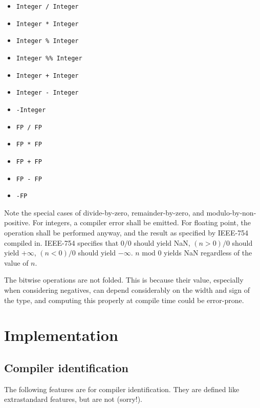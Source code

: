 \documentclass{article}
\begin{document}
\begin{itemize}
\item{\texttt{Integer / Integer}}
\item{\texttt{Integer * Integer}}
\item{\texttt{Integer \% Integer}}
\item{\texttt{Integer \%\% Integer}}
\item{\texttt{Integer + Integer}}
\item{\texttt{Integer - Integer}}
\item{\texttt{-Integer}}
\item{\texttt{FP / FP}}
\item{\texttt{FP * FP}}
\item{\texttt{FP + FP}}
\item{\texttt{FP - FP}}
\item{\texttt{-FP}}
\end{itemize}

Note the special cases of divide-by-zero, remainder-by-zero, and
modulo-by-non-positive. For integers, a compiler error shall be emitted. For
floating point, the operation shall be performed anyway, and the result as
specified by IEEE-754 compiled in. IEEE-754 specifies that $0/0$ should yield
NaN, $(n > 0)/0$ should yield $+\infty$, $(n < 0) / 0$ should yield
$-\infty$. $n \textrm{ mod } 0$ yields NaN regardless of the value of $n$.

The bitwise operations are not folded. This is because their value, especially
when considering negatives, can depend considerably on the width and sign of
the type, and computing this properly at compile time could be error-prone.

\section{Implementation}
\label{sec:implementation}

\subsection{Compiler identification}
\label{sub:implementation:ident}
The following features are for compiler identification. They are defined
like extrastandard features, but are not (sorry!).
\end{document}

